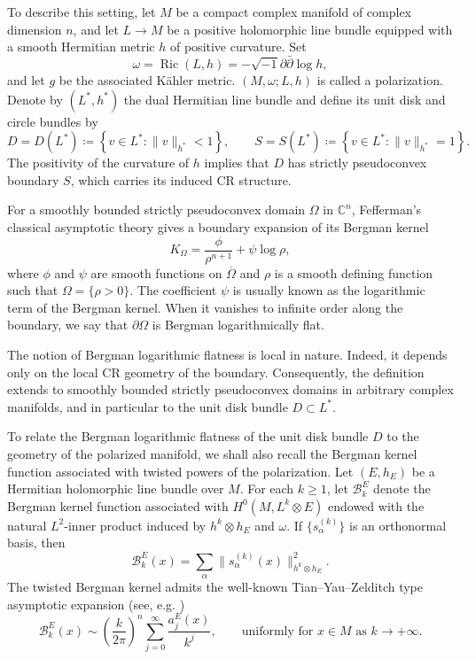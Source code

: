 \documentclass[11pt,reqno]{amsart}
\theoremstyle{corollary}
\theoremstyle{conjecture}
\theoremstyle{assumption}
\theoremstyle{proposition}
\theoremstyle{remark}
\numberwithin{equation}{section}
\newcommand{\ii}{\ensuremath{\sqrt{-1}}}
\newcommand{\pa}{\partial}
\newcommand{\pp}{\bar\partial}
\DeclareMathOperator{\Ric}{Ric}
\begin{document}
To describe this setting, let $M$ be a compact complex manifold of complex dimension $n$, and let $L\rightarrow M$ be a positive holomorphic line bundle equipped with a smooth Hermitian metric $h$ of positive curvature. Set
\[
\omega=\Ric(L,h)=-\ii\pa\pp\log h,
\]
and let $g$ be the associated K\"ahler metric. $(M,\omega;L,h)$ is called a polarization. Denote by $(L^*,h^*)$ the dual Hermitian line bundle and define its unit disk and circle bundles by
\[
D=D(L^*)\coloneq\left\{v\in L^*:\|v\|_{h^*}<1\right\},\qquad S=S(L^*)\coloneq \left\{v\in L^*:\|v\|_{h^*}=1\right\}.
\]
The positivity of the curvature of $h$ implies that $D$ has strictly pseudoconvex boundary $S$, which carries its induced CR structure.

For a smoothly bounded strictly pseudoconvex domain $\Omega$ in $\mathbb{C}^n$, Fefferman's classical asymptotic theory \cite{Fefferman1974} gives a boundary expansion of its Bergman kernel
\[
K_{\Omega}=\frac{\phi}{\rho^{n+1}}+\psi\log \rho,
\]
where $\phi$ and $\psi$ are smooth functions on $\overline{\Omega}$ and $\rho$ is a smooth defining function such that $\Omega=\{\rho>0\}$. The coefficient $\psi$ is usually known as the logarithmic term of the Bergman kernel. When it vanishes to infinite order along the boundary, we say that $\pa \Omega$ is Bergman logarithmically flat.

The notion of Bergman logarithmic flatness is local in nature. Indeed, it depends only on the local CR geometry of the boundary. Consequently, the definition extends to smoothly bounded strictly pseudoconvex domains in arbitrary complex manifolds, and in particular to the unit disk bundle $D\subset L^*$.

To relate the Bergman logarithmic flatness of the unit disk bundle $D$ to the geometry of the polarized manifold, we shall also recall the Bergman kernel function associated with twisted powers of the polarization. Let $(E,h_E)$ be a Hermitian holomorphic line bundle over $M$. For each $k\geq 1$, let $\mathcal{B}_k^E$ denote the Bergman kernel function associated with $H^0(M,L^k\otimes E)$ endowed with the natural $L^2$-inner product induced by $h^k\otimes h_E$ and $\omega$. If $\{s^{(k)}_{\alpha}\}$ is an orthonormal basis, then
\[
\mathcal{B}^E_k(x)=\displaystyle\sum_{\alpha}\|s_{\alpha}^{(k)}(x)\|^2_{h^k\otimes h_E}.
\]
The twisted Bergman kernel admits the well-known Tian--Yau--Zelditch type asymptotic expansion (see, e.g. \cite[Proposition~5.1]{EbenfeltXiaoXu2026})
\begin{equation}\label{eq:asyexp}
\mathcal{B}_k^E(x)\sim \left(\frac{k}{2\pi}\right)^n\sum_{j=0}^{\infty}\frac{a_j^E(x)}{k^j},\qquad \text{uniformly for } x\in M \text{ as } k\rightarrow+\infty.
\end{equation}
\end{document}
